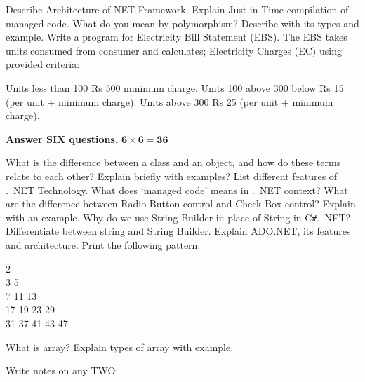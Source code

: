 \documentclass[a4paper, twoside, 12pt, noanswers]{exam}
\newcommand\blankpage{%
    \null
    \thispagestyle{empty}%
    \addtocounter{page}{-1}%
    \newpage}
\newcommand{\cs}{C\texttt{\#}}
\begin{document}
\begin{questions}
	\question Describe Architecture of NET Framework. Explain Just in Time
	compilation of managed code.
	\question What do you mean by polymorphism? Describe with its types and
	example.
	\question Write a program for Electricity Bill Statement (EBS). The EBS
	takes units consumed from consumer and calculates; Electricity
	Charges (EC) using provided criteria:
	\begin{subparts}
		\subpart Units less than 100  Rs 500 minimum charge.
		\subpart Units 100 above 300 below Rs 15 (per unit + minimum
		charge).
		\subpart Units above 300 Rs 25 (per unit + minimum charge).
	\end{subparts}


	{\par}
	{\hspace*{-0.5cm}\noindent\bfseries Answer SIX questions.} \hfill {\( \mathbf{6 \times 6 = 36}\)}

	\question What is the difference between a class and an object, and how do
	these terms relate to each other? Explain briefly with examples?
	\question List different features of .\ NET Technology. What does `managed
	code' means in .\ NET context?
	\question What are the difference between Radio Button control and Check
	Box control? Explain with an example.
	\question Why do we use String Builder in place of String in \cs .\ NET? Differentiate between string and String Builder.
	\question Explain ADO.NET, its features and architecture.
	\question Print the following pattern:

	\begin{mbox}
		\raggedright
		2\\
		3	5\\
		7	11	13	\\
		17	19	23	29\\
		31	37	41	43	47\\
	\end{mbox}

	\question What is array? Explain types of array with example.

	\question Write notes on any TWO:



\end{questions}
\afterpage{\blankpage}
\end{document}
